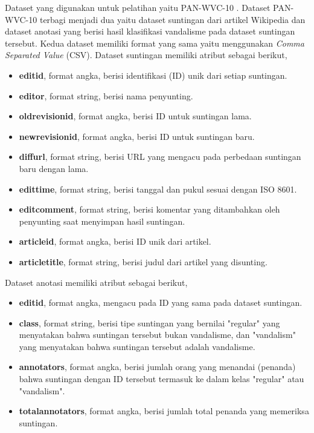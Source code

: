 Dataset yang digunakan untuk pelatihan yaitu PAN-WVC-10
\cite{potthast:2010b}.
Dataset PAN-WVC-10 terbagi menjadi dua yaitu dataset suntingan dari artikel
Wikipedia dan dataset anotasi yang berisi hasil klasifikasi vandalisme pada
dataset suntingan tersebut.
Kedua dataset memiliki format yang sama yaitu menggunakan \textit{Comma
Separated Value} (CSV).
Dataset suntingan memiliki atribut sebagai berikut,

\begin{itemize}
	\item \textbf{editid}, format angka, berisi identifikasi (ID) unik dari setiap suntingan.
	\item \textbf{editor}, format string, berisi nama penyunting.
	\item \textbf{oldrevisionid}, format angka, berisi ID untuk suntingan lama.
	\item \textbf{newrevisionid}, format angka, berisi ID untuk suntingan baru.
	\item \textbf{diffurl}, format string, berisi URL yang mengacu pada perbedaan suntingan baru dengan lama.
	\item \textbf{edittime}, format string, berisi tanggal dan pukul sesuai dengan ISO 8601.
	\item \textbf{editcomment}, format string, berisi komentar yang ditambahkan oleh penyunting saat menyimpan hasil suntingan.
	\item \textbf{articleid}, format angka, berisi ID unik dari artikel.
	\item \textbf{articletitle}, format string, berisi judul dari artikel yang disunting.
\end{itemize}

Dataset anotasi memiliki atribut sebagai berikut,
\begin{itemize}
	\item \textbf{editid}, format angka, mengacu pada ID yang sama pada
	dataset suntingan.
	\item \textbf{class}, format string, berisi tipe suntingan yang
	bernilai "regular" yang menyatakan bahwa suntingan tersebut bukan
	vandalisme, dan "vandalism" yang menyatakan bahwa suntingan tersebut
	adalah vandalisme.
	\item \textbf{annotators}, format angka, berisi jumlah orang yang
	menandai (penanda) bahwa suntingan dengan ID tersebut termasuk ke dalam
	kelas "regular" atau "vandalism".
	\item \textbf{totalannotators}, format angka, berisi jumlah total penanda yang memeriksa suntingan.
\end{itemize}

